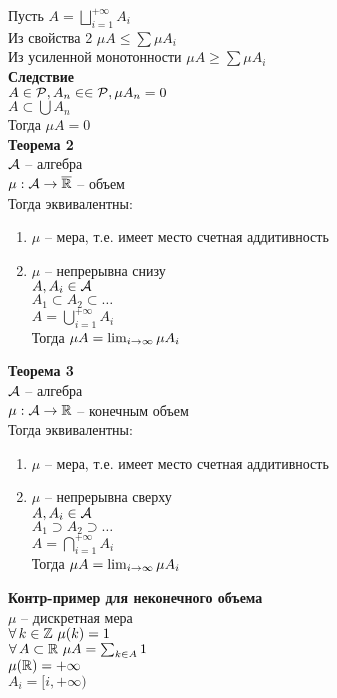 \documentclass[12pt]{article}
\begin{document}
Пусть $A = \bigsqcup_{i=1}^{+\infty} A_i$\\
Из свойства 2 $\mu A \leq \sum \mu A_i$\\
Из усиленной монотонности $\mu A \geq \sum \mu A_i$\\
\textbf{Следствие}\\
$A \in \mathcal P, A_n \in \in \mathcal P, \mu A_n = 0$\\
$A \subset \bigcup A_n$\\
Тогда $\mu A = 0$\\
\textbf{Теорема 2}\\
$\mathcal A$ -- алгебра\\
$\mu: \mathcal A \rightarrow \overline{\mathbb{R}}$ -- объем\\
Тогда эквивалентны:
\begin{enumerate}
    \item $\mu$ -- мера, т.е. имеет место счетная аддитивность
    \item $\mu$ -- непрерывна снизу\\
    $A, A_i \in \mathcal A$\\
    $A_1 \subset A_2 \subset \ldots$\\
    $A = \bigcup_{i=1}^{+\infty} A_i$\\
    Тогда $\mu A = \lim_{i\rightarrow \infty} \mu A_i$
\end{enumerate}
\textbf{Теорема 3}\\
$\mathcal A$ -- алгебра\\
$\mu: \mathcal A \rightarrow \mathbb{R}$ -- конечным объем\\
Тогда эквивалентны:
\begin{enumerate}
    \item $\mu$ -- мера, т.е. имеет место счетная аддитивность
    \item $\mu$ -- непрерывна сверху\\
    $A, A_i \in \mathcal A$\\
    $A_1 \supset A_2 \supset \ldots$\\
    $A = \bigcap_{i=1}^{+\infty} A_i$\\
    Тогда $\mu A = \lim_{i\rightarrow \infty} \mu A_i$
\end{enumerate}
\textbf{Контр-пример для неконечного объема}\\
$\mu$ -- дискретная мера\\
$\forall\, k \in \mathbb{Z}\ \mu(k) = 1$\\
$\forall\, A \subset \mathbb{R}\ \mu A = \sum_{k\in A} 1$\\
$\mu(\mathbb{R}) = +\infty$\\
$A_i = [i, +\infty)$\\
\end{document}
